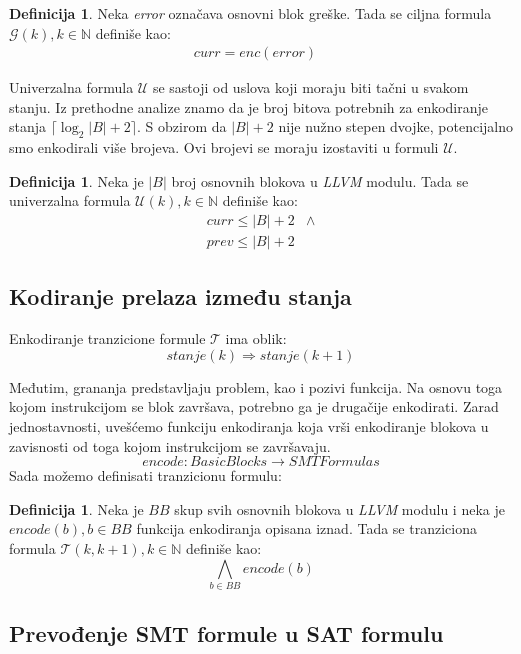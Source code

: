\documentclass[a4paper]{article}
\theoremstyle{plain}
\theoremstyle{definition}
\newtheorem{defn}[thm]{Definicija} %
\begin{document}
\begin{defn}
Neka \emph{error} označava osnovni blok greške. Tada se ciljna formula $\mathcal{G}(k), k \in \mathbb{N}$ definiše kao:
    $$\begin{array}{rl}
    curr = enc(\mathit{error}) &
    \end{array}$$
\end{defn}

Univerzalna formula $\mathcal{U}$ se sastoji od uslova koji moraju biti tačni u svakom stanju. Iz prethodne analize znamo da je broj bitova potrebnih za enkodiranje stanja $\lceil\log_{2}{|B| + 2}\rceil$. S obzirom da $|B| + 2$ nije nužno stepen dvojke, potencijalno smo enkodirali više brojeva. Ovi brojevi se moraju izostaviti u formuli $\mathcal{U}$.

\begin{defn}
Neka je $|B|$ broj osnovnih blokova u \emph{LLVM} modulu. Tada se univerzalna formula $\mathcal{U}(k), k \in \mathbb{N}$ definiše kao:
    $$\begin{array}{rl}
    curr \leq |B|+2 & \wedge \\
    prev \leq |B|+2 &
    \end{array}$$
\end{defn}

\subsection{Kodiranje prelaza između stanja}
\label{subsec:KodiranjePrelaza}

Enkodiranje tranzicione formule $\mathcal{T}$ ima oblik:
    $$stanje(k) \Rightarrow stanje(k+1)$$

Međutim, grananja predstavljaju problem, kao i pozivi funkcija. Na osnovu toga kojom instrukcijom se blok završava, potrebno ga je drugačije enkodirati. Zarad jednostavnosti, uvešćemo funkciju enkodiranja koja vrši enkodiranje blokova u zavisnosti od toga kojom instrukcijom se završavaju.
$$\mathit{encode} : BasicBlocks \rightarrow SMTFormulas$$
Sada možemo definisati tranzicionu formulu:

\begin{defn}
Neka je $BB$ skup svih osnovnih blokova u \emph{LLVM} modulu i neka je $\mathit{encode}(b), b \in BB$ funkcija enkodiranja opisana iznad. Tada se tranziciona formula $\mathcal{T}(k, k+1), k \in \mathbb{N}$ definiše kao:
    $$\bigwedge_{b \in BB} \mathit{encode}(b)$$
\end{defn}


\subsection{Prevođenje SMT formule u SAT formulu}
\label{subsec:SMTtoSAT}
\end{document}
